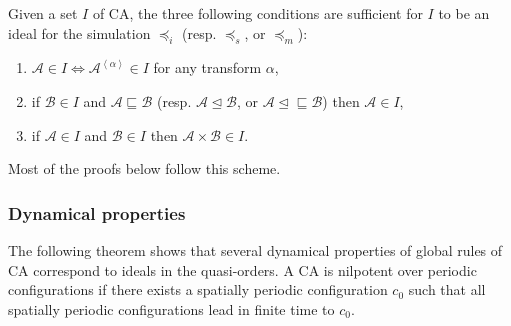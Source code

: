 \documentclass[a4paper]{elsarticle}
\newcommand{\ACA}{\mathcal{A}}
\newcommand{\ACB}{\mathcal{B}}
\newcommand\sac{\sqsubseteq}
\newcommand{\fac}{\trianglelefteq}
\newcommand{\facsac}{\fac\!\sac}
\newcommand\bulk[2]{{#1}^{\left\langle{#2}\right\rangle}}
\newcommand{\simu}{\preccurlyeq}
\newcommand{\sacsimu}{\simu_i}
\newcommand{\facsimu}{\simu_s}
\newcommand{\facsacsimu}{\simu_m}
\begin{document}
Given a set $I$ of CA, the three following conditions are sufficient for
$I$ to be an ideal for the simulation $\sacsimu$ (resp. $\facsimu$, or
$\facsacsimu$):
\begin{enumerate}
\item ${\ACA\in I\iff\bulk{\ACA}{\alpha}\in I}$ for any transform $\alpha$,
\item if ${\ACB\in I}$ and ${\ACA\sac\ACB}$ (resp. ${\ACA\fac\ACB}$,
  or ${\ACA\facsac\ACB}$) then ${\ACA\in I}$,
\item if ${\ACA\in I}$ and ${\ACB\in I}$ then ${\ACA\times\ACB\in I}$.
\end{enumerate}

Most of the proofs below follow this scheme.  

\subsubsection{Dynamical properties}

The following theorem shows that several dynamical properties of
global rules of CA correspond to ideals in the quasi-orders.  A CA is
nilpotent over periodic configurations if there exists a spatially
periodic configuration $c_0$ such that all spatially periodic
configurations lead in finite time to $c_0$.
\end{document}
